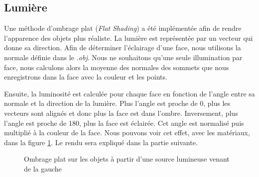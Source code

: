         \subsection{Lumière}
        \label{subsubsec:lumiere}

        Une méthode d'ombrage plat (\textit{Flat Shading}) a été implémentée afin de rendre l'apparence des objets plus réaliste. La lumière est représentée par un vecteur qui donne sa direction. Afin de déterminer l'éclairage d'une face, nous utilisons la normale définie dans le \emph{.obj}. Nous ne souhaitons qu'une seule illumination par face, nous calculons alors la moyenne des normales des sommets que nous enregistrons dans la face avec la couleur et les points. 

        Ensuite, la luminosité est calculée pour chaque face en fonction de l'angle entre sa normale et la direction de la lumière. Plus l'angle est proche de 0\degree, plus les vecteurs sont alignés et donc plus la face est dans l'ombre. Inversement, plus l'angle est proche de 180\degree, plus la face est éclairée. Cet angle est normalisé puis multiplié à la couleur de la face. Nous pouvons voir cet effet, avec les matériaux, dans la figure \ref{fig:lumiere}. Le rendu sera expliqué dans la partie suivante.

        \begin{figure}[h]
            \centering

            \hspace{.005\textwidth}

            \caption{Ombrage plat sur les objets à partir d'une source lumineuse venant de la gauche}
            \label{fig:lumiere}
        \end{figure}

